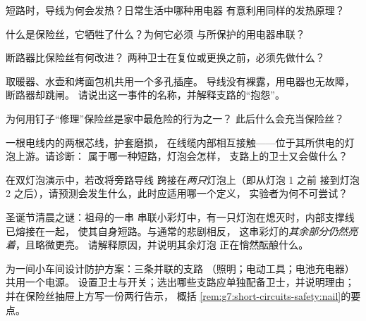 \begin{exercise}[$\star$]\label{exo:g7:short-circuits-safety:4}
短路时，导线为何会发热？日常生活中哪种用电器
有意利用同样的发热原理？
\end{exercise}

\begin{exercise}[$\star$]\label{exo:g7:short-circuits-safety:5}
什么是保险丝，它牺牲了什么？为何它必须
与所保护的用电器串联？
\end{exercise}

\begin{exercise}[$\star$]\label{exo:g7:short-circuits-safety:6}
断路器比保险丝有何改进？
两种卫士在复位或更换之前，必须先做什么？
\end{exercise}

\begin{exercise}[$\star$]\label{exo:g7:short-circuits-safety:7}
取暖器、水壶和烤面包机共用一个多孔插座。
导线没有裸露，用电器也无故障，断路器却跳闸。
请说出这一事件的名称，并解释支路的“抱怨”。
\end{exercise}

\begin{exercise}[$\star$]\label{exo:g7:short-circuits-safety:8}
为何用钉子“修理”保险丝是家中最危险的行为之一？
此后什么会充当保险丝？
\end{exercise}

\begin{exercise}[$\star\star$]\label{exo:g7:short-circuits-safety:9}
一根电线内的两根芯线，护套磨损，
在线缆内部相互接触——位于其所供电的灯泡上游。请诊断：
属于哪一种短路，灯泡会怎样，
支路上的卫士又会做什么？
\end{exercise}

\begin{exercise}[$\star\star$]\label{exo:g7:short-circuits-safety:10}
在双灯泡演示中，若改将旁路导线
跨接在\emph{两只}灯泡上（即从灯泡 1 之前
接到灯泡 2 之后），请预测会发生什么，此时应适用哪一个定义，
实验者为何不可尝试？
\end{exercise}

\begin{exercise}[$\star\star$]\label{exo:g7:short-circuits-safety:11}
圣诞节清晨之谜：祖母的一串
串联小彩灯中，有一只灯泡在熄灭时，内部支撑线已熔接在一起，
使其自身短路。与通常的悲剧相反，
这串彩灯的\emph{其余部分仍然亮着}，且略微更亮。
请解释原因，并说明其余灯泡
正在悄然酝酿什么。
\end{exercise}

\begin{exercise}[$\star\star\star$]\label{exo:g7:short-circuits-safety:12}
为一间小车间设计防护方案：三条并联的支路
（照明；电动工具；电池充电器）共用一个电源。
设置卫士与开关；选出哪些支路应单独配备卫士，并说明理由；
并在保险丝抽屉上方写一份两行告示，
概括
\cref{rem:g7:short-circuits-safety:nail}的要点。
\end{exercise}

